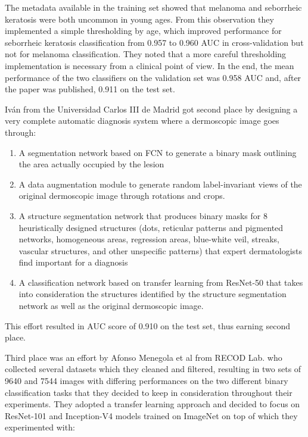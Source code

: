 The metadata available in the training set showed that melanoma and seborrheic keratosis were both uncommon in young ages. From this observation they implemented a simple thresholding by age, which improved performance for seborrheic keratosis classification from 0.957 to 0.960 AUC in cross-validation but not for melanoma classification. They noted that a more careful thresholding implementation is necessary from a clinical point of view. In the end, the mean performance of the two classifiers on the validation set was 0.958 AUC and, after the paper was published, 0.911 on the test set.

Iván from the Universidad Carlos III de Madrid \cite{isic2017second} got second place by designing a very complete automatic diagnosis system where a dermoscopic image goes through:

\begin{enumerate}
    \item A segmentation network based on \ac{FCN} \cite{fcn} to generate a binary mask outlining the area actually occupied by the lesion
    \item A data augmentation module to generate random label-invariant views of the original dermoscopic image through rotations and crops.
    \item A structure segmentation network that produces binary masks for 8 heuristically designed structures (dots, reticular patterns and pigmented networks, homogeneous areas, regression areas, blue-white veil, streaks, vascular structures, and other unspecific patterns) that expert dermatologists find important for a diagnosis
    \item A classification network based on transfer learning from ResNet-50 \cite{resnet} that takes into consideration the structures identified by the structure segmentation network as well as the original dermoscopic image.
\end{enumerate}

This effort resulted in AUC score of 0.910 on the test set, thus earning second place.

Third place was an effort by Afonso Menegola et al \cite{isic2017third} from RECOD Lab. who collected several datasets which they cleaned and filtered, resulting in two sets of 9640 and 7544 images with differing performances on the two different binary classification tasks that they decided to keep in consideration throughout their experiments. They adopted a transfer learning approach and decided to focus on ResNet-101 and Inception-V4 models trained on ImageNet on top of which they experimented with:


